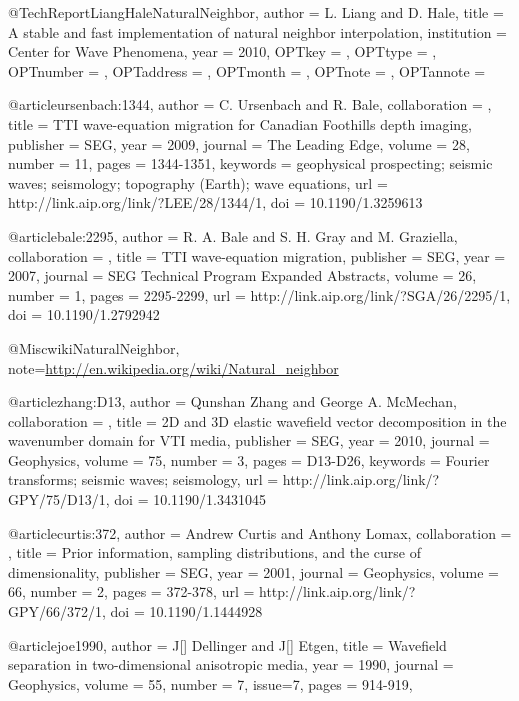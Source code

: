 @TechReport{LiangHaleNaturalNeighbor,
  author = 	 {L. Liang and D. Hale},
  title = 	 {A stable and fast implementation of natural neighbor
                  interpolation},
  institution =  {Center for Wave Phenomena},
  year = 	 {2010},
  OPTkey = 	 {},
  OPTtype = 	 {},
  OPTnumber = 	 {},
  OPTaddress = 	 {},
  OPTmonth = 	 {},
  OPTnote = 	 {},
  OPTannote = 	 {}
}


@article{ursenbach:1344,
author = {C. Ursenbach and R. Bale},
collaboration = {},
title = {TTI wave-equation migration for Canadian Foothills depth imaging},
publisher = {SEG},
year = {2009},
journal = {The Leading Edge},
volume = {28},
number = {11},
pages = {1344-1351},
keywords = {geophysical prospecting; seismic waves; seismology; topography (Earth); wave equations},
url = {http://link.aip.org/link/?LEE/28/1344/1},
doi = {10.1190/1.3259613}
}







@article{bale:2295,
author = {R. A. Bale and S. H. Gray and M. Graziella},
collaboration = {},
title = {TTI wave-equation migration},
publisher = {SEG},
year = {2007},
journal = {SEG Technical Program Expanded Abstracts},
volume = {26},
number = {1},
pages = {2295-2299},
url = {http://link.aip.org/link/?SGA/26/2295/1},
doi = {10.1190/1.2792942}
}


@Misc{wikiNaturalNeighbor,
  note={\url{http://en.wikipedia.org/wiki/Natural_neighbor}  }
}



@article{zhang:D13,
author = {Qunshan Zhang and George A. McMechan},
collaboration = {},
title = {2{D} and 3{D} elastic wavefield vector decomposition in the wavenumber domain for VTI media},
publisher = {SEG},
year = {2010},
journal = {Geophysics},
volume = {75},
number = {3},
pages = {D13-D26},
keywords = {{F}ourier transforms; seismic waves; seismology},
url = {http://link.aip.org/link/?GPY/75/D13/1},
doi = {10.1190/1.3431045}
}



@article{curtis:372,
author = {Andrew Curtis and Anthony Lomax},
collaboration = {},
title = {Prior information, sampling distributions, and the curse of dimensionality},
publisher = {SEG},
year = {2001},
journal = {Geophysics},
volume = {66},
number = {2},
pages = {372-378},
url = {http://link.aip.org/link/?GPY/66/372/1},
doi = {10.1190/1.1444928}
}

@article{joe1990,
author = {J[] Dellinger and J[] Etgen},
title = {Wavefield separation in two-dimensional anisotropic media},
year = {1990},
journal = {Geophysics},
volume = {55},
number = {7},
issue={7},
pages = {914-919},
}

